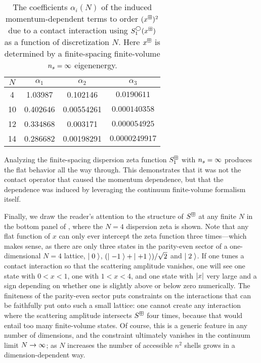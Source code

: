 \begin{table}
    \caption{
    The coefficients $\alpha_i(N)$ of the induced momentum-dependent terms to order $(x^\boxplus)^2$ due to a contact interaction using $S^\bigcirc_1(x^\boxplus)$ as a function of discretization $N$.
    Here $x^\boxplus$ is determined by a finite-spacing finite-volume ${n_s}=\infty$ eigenenergy.}
    \label{tab:induced terms in 1 d}
    \begin{tabular}{c|ccc}
    $N$ & $\alpha_1$ & $\alpha_2$ & $\alpha_3$\\
                \hline
      4 &    1.03987& 0.102146 & $0.0190611$\\
    10  &   0.402646 & 0.00554261 & $ 0.000140358$    \\
    12  &   0.334868 & 0.003171 &$ 0.000054925$    \\
    14  &   0.286682 & 0.00198291 &$0.0000249917$    \\
    \end{tabular}
\end{table}


Analyzing the finite-spacing dispersion zeta function $S^{\boxplus}_1$ with ${n_s}=\infty$ produces the flat behavior all the way through.
This demonstrates that it was not the contact operator that caused the momentum dependence, but that the dependence was induced by leveraging the continuum finite-volume formalism itself.

Finally, we draw the reader's attention to the structure of $S^\boxplus$ at any finite $N$ in the bottom panel of , where the $N=4$ dispersion zeta is shown.
Note that any flat function of $x$ can only ever intercept the zeta function three times---which makes sense, as there are only three states in the parity-even sector of a one-dimensional $N=4$ lattice, $\left|\;0\;\right\rangle$, $(\left|\;-1\;\right\rangle+\left|\;+1\;\right\rangle)/\sqrt{2}$ and $\left|\;2\;\right\rangle$.
If one tunes a contact interaction so that the scattering amplitude vanishes, one will see one state with $0<x<1$, one with $1<x<4$, and one state with $\left| x \right|$ very large and a sign depending on whether one is slightly above or below zero numerically.
The finiteness of the parity-even sector puts constraints on the interactions that can be faithfully put onto such a small lattice: one cannot create any interaction where the scattering amplitude intersects $S^{\boxplus}$ four times, because that would entail too many finite-volume states.
Of course, this is a generic feature in any number of dimensions, and the constraint ultimately vanishes in the continuum limit $N\rightarrow\infty$; as $N$ increases the number of accessible $n^2$ shells grows in a dimension-dependent way.
